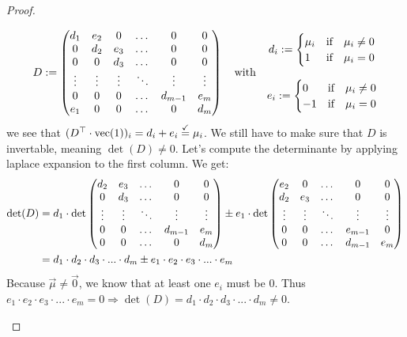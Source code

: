 \begin{proof}
\begin{enumerate}
        $$D := \left(\begin{matrix}
            d_1 & e_2 & 0 & \dots & 0 & 0\\
            0 & d_2 & e_3 & \dots & 0 & 0\\
            0 & 0 & d_3 & \dots & 0 & 0\\
            \vdots & \vdots & \vdots & \ddots & \vdots & \vdots\\
            0 & 0 & 0 & \dots & d_{m-1} & e_m\\
            e_1 & 0 & 0 & \dots & 0 & d_m
        \end{matrix}\right) \quad\textrm{with}\quad 
        \begin{matrix}
            d_i := \begin{cases}
                \mu_i &\textrm{if}\quad \mu_i \neq 0\\
                1 &\textrm{if}\quad \mu_i = 0
            \end{cases}\\\\
            e_i := \begin{cases}
                0 &\textrm{if}\quad \mu_i \neq 0\\
                -1 &\textrm{if}\quad \mu_i = 0
            \end{cases}
        \end{matrix}$$
        we see that $(D^\top \cdot \operatorname{vec}(1))_i = d_i + e_i \stackrel{\checkmark}{=} \mu_i$. We still have to make sure that $D$ is invertable, meaning $\det(D) \neq 0$. Let's compute the determinante by applying laplace expansion to the first column. We get:
        \begin{align*}  
            \det(D) &= d_1 \cdot \det\left(\begin{matrix}
                d_2 & e_3 & \dots & 0 & 0\\
                0 & d_3 & \dots & 0 & 0\\
                \vdots & \vdots & \ddots & \vdots& \vdots\\
                0 & 0 & \dots & d_{m-1} & e_m\\
                0 & 0 & \dots & 0 & d_m
            \end{matrix}\right) \pm e_1 \cdot \det\left(\begin{matrix}
                e_2 & 0 & \dots & 0 & 0\\
                d_2 & e_3 & \dots & 0 & 0\\
                \vdots & \vdots & \ddots & \vdots& \vdots\\
                0 & 0 & \dots & e_{m-1} & 0\\
                0 & 0 & \dots & d_{m-1} & e_m
            \end{matrix}\right)\\
            &= d_1 \cdot d_2 \cdot d_3 \cdot ... \cdot d_m \pm e_1 \cdot e_2 \cdot e_3 \cdot ... \cdot e_m 
        \end{align*}
        Because $\vec\mu \neq \vec0$, we know that at least one $e_i$ must be 0. Thus $e_1 \cdot e_2 \cdot e_3 \cdot ... \cdot e_m = 0 \Rightarrow \det(D) = d_1 \cdot d_2 \cdot d_3 \cdot ... \cdot d_m \neq 0$.


\end{enumerate}
\end{proof}
